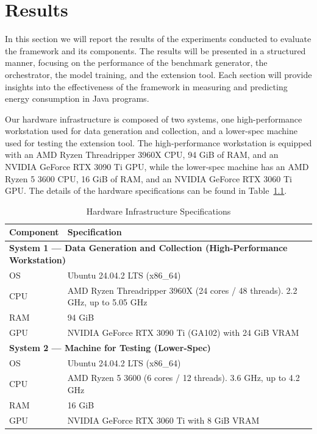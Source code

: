 \chapter{Results}\label{chapter:results}


In this section we will report the results of the experiments conducted to evaluate the framework and its components. The results will be presented in a structured manner, focusing on the performance of the benchmark generator, the orchestrator, the model training, and the extension tool. Each section will provide insights into the effectiveness of the framework in measuring and predicting energy consumption in Java programs.

Our hardware infrastructure is composed of two systems, one high-performance workstation used for data generation and collection, and a lower-spec machine used for testing the extension tool. The high-performance workstation is equipped with an AMD Ryzen Threadripper 3960X CPU, 94 GiB of RAM, and an NVIDIA GeForce RTX 3090 Ti GPU, while the lower-spec machine has an AMD Ryzen 5 3600 CPU, 16 GiB of RAM, and an NVIDIA GeForce RTX 3060 Ti GPU. The details of the hardware specifications can be found in Table~\ref{tab:hardware_specs}.

\begin{table}[htbp]
  \small
  \centering
  \caption{Hardware Infrastructure Specifications}
  \label{tab:hardware_specs}
  \begin{tabularx}{\textwidth}{l X}
    \toprule
    \textbf{Component} & \textbf{Specification} \\
    \midrule
    \multicolumn{2}{l}{\textbf{System 1 — Data Generation and Collection (High-Performance Workstation)}} \\
    \cmidrule(r){1-2}
    OS & Ubuntu 24.04.2 LTS (x86\_64) \\
    CPU                 & AMD Ryzen Threadripper 3960X (24 cores / 48 threads). 2.2 GHz, up to 5.05 GHz \\
    RAM                 & 94 GiB \\
    GPU                 & NVIDIA GeForce RTX 3090 Ti (GA102) with 24 GiB VRAM \\
    \midrule
    \multicolumn{2}{l}{\textbf{System 2 — Machine for Testing (Lower-Spec)}} \\
    \cmidrule(r){1-2}
    OS                  & Ubuntu 24.04.2 LTS (x86\_64) \\
    CPU                 & AMD Ryzen 5 3600 (6 cores / 12 threads). 3.6 GHz, up to 4.2 GHz \\
    RAM                 & 16 GiB \\
    GPU                 & NVIDIA GeForce RTX 3060 Ti with 8 GiB VRAM \\
    \bottomrule
  \end{tabularx}
\end{table}


